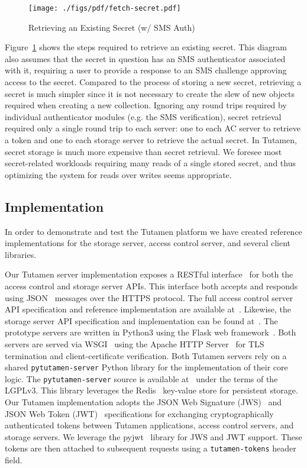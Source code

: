 \begin{figure}[th]
  \centering
  \texttt{[image: ./figs/pdf/fetch-secret.pdf]}
  \caption{Retrieving an Existing Secret (w/ SMS Auth)}
  \label{fig:tutamen:fetchsecret}
\end{figure}

Figure~\ref{fig:tutamen:fetchsecret} shows the steps required to
retrieve an existing secret. This diagram also assumes that the secret
in question has an SMS authenticator associated with it, requiring a
user to provide a response to an SMS challenge approving access to the
secret. Compared to the process of storing a new secret, retrieving a
secret is much simpler since it is not necessary to create the slew of
new objects required when creating a new collection. Ignoring any
round trips required by individual authenticator modules (e.g. the SMS
verification), secret retrieval required only a single round trip to
each server: one to each AC server to retrieve a token and one to each
storage server to retrieve the actual secret. In Tutamen, secret
storage is much more expensive than secret retrieval. We foresee most
secret-related workloads requiring many reads of a single stored
secret, and thus optimizing the system for reads over writes seems
appropriate.

\subsection{Implementation}

In order to demonstrate and test the Tutamen platform we have created
reference implementations for the storage server, access control
server, and several client libraries.

Our Tutamen server implementation exposes a RESTful
interface~\cite{fielding2000} for both the access control and storage
server APIs. This interface both accepts and responds using
JSON~\cite{json} messages over the HTTPS protocol. The full access
control server API specification and reference implementation are
available at~\cite{src-tutamen-apiaccesscontrol}. Likewise, the
storage server API specification and implementation can be found
at~\cite{src-tutamen-apistorage}. The prototype servers are written in
Python3 using the Flask web framework~\cite{python-flask}. Both
servers are served via WSGI~\cite{pep3333} using the Apache HTTP
Server~\cite{apache} for TLS termination and client-certificate
verification. Both Tutamen servers rely on a shared
\texttt{pytutamen-server} Python library for the implementation of
their core logic. The \texttt{pytutamen-server} source is available
at~\cite{src-tutamen-pytutamenserver} under the terms of the
LGPLv3. This library leverages the Redis~\cite{redis} key-value store
for persistent storage. Our Tutamen implementation adopts the JSON Web
Signature (JWS)~\cite{rfc7515} and JSON Web Token (JWT)~\cite{rfc7519}
specifications for exchanging cryptographically authenticated tokens
between Tutamen applications, access control servers, and storage
servers. We leverage the pyjwt~\cite{pyjwt} library for JWS and JWT
support. These tokens are then attached to subsequent requests using a
\texttt{tutamen-tokens} header field.

